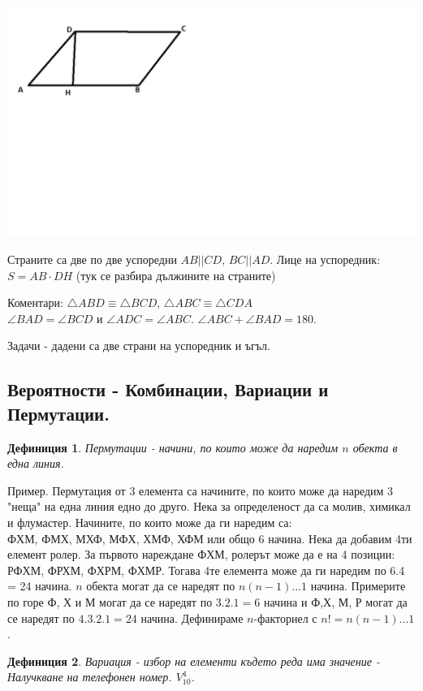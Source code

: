 \documentclass{article}
\newtheorem{definition}{Дефиниция}
\begin{document}
\includegraphics{Parallelogram}
\vspace{-6cm}

Страните са две по две успоредни $AB || CD$, $BC||AD $. 
Лице на успоредник: $S = AB \cdot DH$ (тук се разбира дължините на страните)

Коментари: $\triangle ABD \equiv \triangle  BCD $, 
 $\triangle ABC \equiv \triangle CDA $ \\
 $\angle BAD = \angle BCD $ и $ \angle ADC = \angle ABC $. $\angle ABC + \angle BAD = 180$.


Задачи - дадени са две страни на успоредник и ъгъл.

\subsection{Вероятности - Комбинации, Вариации и Пермутации.}

\begin{definition}
	Пермутации - начини, по които може да наредим $n$ обекта в една линия.
\end{definition}
Пример. Пермутация от 3 елемента са начините, по които може да наредим 3 "неща" на една линия едно до друго. Нека за определеност да са молив, химикал и флумастер. Начините, по които може да ги наредим са: \\
ФХМ, ФМХ, МХФ, МФХ, ХМФ, ХФМ или общо 6 начина. Нека да добавим 4ти елемент ролер. За първото нареждане ФХМ, ролерът може да е на 4 позиции:
РФХМ, ФРХМ, ФХРМ, ФХМР. Тогава 4те елемента може да ги наредим по 6.4 = 24 начина. $n$ обекта могат да се наредят по $n(n-1)...1$ начина. 
Примерите по горе Ф, Х и М могат да се наредят по $3.2.1 =6 $ начина и Ф,Х, М, Р могат да се наредят по $4.3.2.1 = 24$ начина. Дефинираме $n$-факториел с $n! = n(n-1)...1$.


\begin{definition}
Вариация - избор на елементи където реда има значение - Налучкване на телефонен номер. $V_{10}^4$.
\end{definition}
\end{document}
